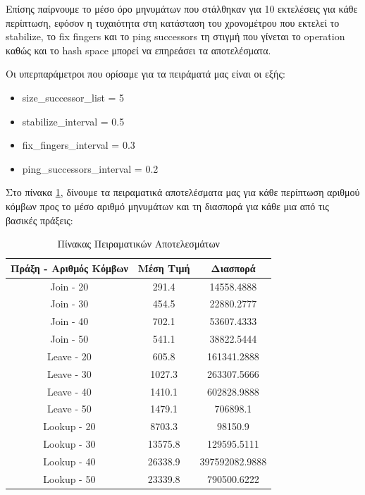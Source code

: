 \documentclass[12pt,a4paper]{article}
\begin{document}
Επίσης παίρνουμε το μέσο όρο μηνυμάτων που στάλθηκαν για 10 εκτελέσεις για κάθε περίπτωση, εφόσον η τυχαιότητα στη κατάσταση του χρονομέτρου που εκτελεί το stabilize, το fix fingers και το ping successors τη στιγμή που γίνεται το operation καθώς και το hash space μπορεί να επηρεάσει τα αποτελέσματα.

Οι υπερπαράμετροι που ορίσαμε για τα πειράματά μας είναι οι εξής:
\begin{itemize}
	\item size\_successor\_list = 5
	\item stabilize\_interval = 0.5
	\item fix\_fingers\_interval = 0.3
	\item ping\_successors\_interval = 0.2
\end{itemize}

Στο πίνακα \ref{resuls_table}, δίνουμε τα πειραματικά αποτελέσματα μας για κάθε περίπτωση αριθμού κόμβων προς το μέσο αριθμό μηνυμάτων και τη διασπορά για κάθε μια από τις βασικές πράξεις:

\begin{table}[H]
	\centering
	\begin{adjustbox}{width={0.8\textwidth},totalheight={0.8\textheight},keepaspectratio}%
		\begin{tabular}{|c|c|c|}
			\hline
			\textbf{Πράξη - Αριθμός Κόμβων} & \textbf{Μέση Τιμή} & \textbf{Διασπορά} \\
			\hline
			Join - 20                       & 291.4              & 14558.4888        \\
			\hline
			Join - 30                       & 454.5              & 22880.2777        \\
			\hline
			Join - 40                       & 702.1              & 53607.4333        \\
			\hline
			Join - 50                       & 541.1              & 38822.5444        \\
			\hline
			Leave - 20                      & 605.8              & 161341.2888       \\
			\hline
			Leave - 30                      & 1027.3             & 263307.5666       \\
			\hline
			Leave - 40                      & 1410.1             & 602828.9888       \\
			\hline
			Leave - 50                      & 1479.1             & 706898.1          \\
			\hline
			Lookup - 20                     & 8703.3             & 98150.9           \\
			\hline
			Lookup - 30                     & 13575.8            & 129595.5111       \\
			\hline
			Lookup - 40                     & 26338.9            & 397592082.9888    \\
			\hline
			Lookup - 50                     & 23339.8            & 790500.6222       \\
			\hline
		\end{tabular}
	\end{adjustbox}
	\caption{Πίνακας Πειραματικών Αποτελεσμάτων}
	\label{resuls_table}
\end{table}
\end{document}
